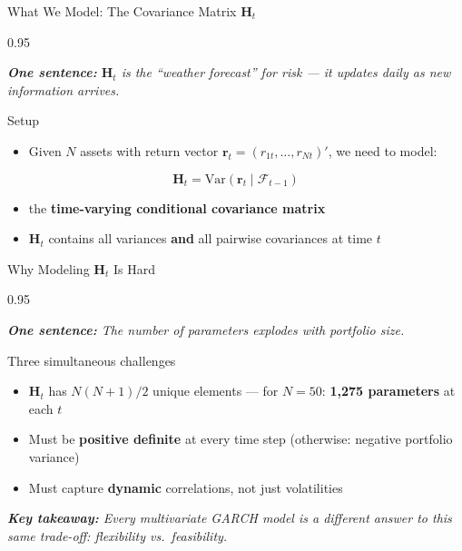 \documentclass[9pt, aspectratio=169, t]{beamer}
\begin{document}
\begin{frame}{What We Model: The Covariance Matrix $\mathbf{H}_t$}
    \begin{cminipage}{0.95\textwidth}
    {\footnotesize
    \textit{\textbf{One sentence:} $\mathbf{H}_t$ is the ``weather forecast'' for risk --- it updates daily as new information arrives.}
    \vspace{0.2cm}
    \begin{block}{Setup}
        \begin{itemize}\setlength{\itemsep}{2pt}
            \item Given $N$ assets with return vector $\mathbf{r}_t = (r_{1t}, \ldots, r_{Nt})'$, we need to model:
        \end{itemize}
        \[
            \mathbf{H}_t = \text{Var}(\mathbf{r}_t \mid \mathcal{F}_{t-1})
        \]
        \begin{itemize}\setlength{\itemsep}{2pt}
            \item the \textbf{time-varying conditional covariance matrix}
            \item $\mathbf{H}_t$ contains all variances \textbf{and} all pairwise covariances at time $t$
        \end{itemize}
    \end{block}
    }
    \end{cminipage}
\end{frame}

\begin{frame}{Why Modeling $\mathbf{H}_t$ Is Hard}
    \begin{cminipage}{0.95\textwidth}
    {\footnotesize
    \textit{\textbf{One sentence:} The number of parameters explodes with portfolio size.}
    \vspace{0.2cm}
    \begin{alertblock}{Three simultaneous challenges}
        \begin{itemize}\setlength{\itemsep}{3pt}
            \item $\mathbf{H}_t$ has $N(N+1)/2$ unique elements --- for $N = 50$: \textbf{1,275 parameters} at each $t$
            \item Must be \textbf{positive definite} at every time step (otherwise: negative portfolio variance)
            \item Must capture \textbf{dynamic} correlations, not just volatilities
        \end{itemize}
    \end{alertblock}
    \vspace{0.2cm}
    \textit{\textbf{Key takeaway:} Every multivariate GARCH model is a different answer to this same trade-off: flexibility vs.\ feasibility.}
    }
    \end{cminipage}
\end{frame}
\end{document}
